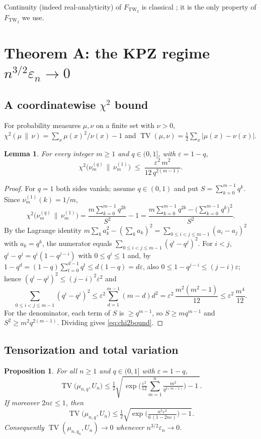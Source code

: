 \documentclass[12pt]{article}
\newtheorem{proposition}{Proposition}
\newtheorem{lemma}{Lemma}
\theoremstyle{definition}
\DeclareMathOperator{\TV}{TV}
\newcommand{\TW}{\mathrm{TW}_2}
\newcommand{\eps}{\varepsilon}
\begin{document}
Continuity (indeed real-analyticity) of $F_{\TW}$ is classical \cite{TW}; it is the only
property of $F_{\TW}$ we use.

\section{Theorem A: the KPZ regime $n^{3/2}\eps_n\to0$}\label{sec:A}

\subsection{A coordinatewise $\chi^2$ bound}
For probability measures $\mu,\nu$ on a finite set with $\nu>0$,
$\chi^2(\mu\,\|\,\nu)=\sum_x \mu(x)^2/\nu(x)-1$ and
$\TV(\mu,\nu)=\tfrac12\sum_x|\mu(x)-\nu(x)|$.

\begin{lemma}\label{lem:chi2}
For every integer $m\ge1$ and $q\in(0,1]$, with $\eps=1-q$,
\begin{equation}\label{eq:chi2bound}
\chi^2\!\big(\nu^{(q)}_m\,\big\|\,\nu^{(1)}_m\big)\;\le\;\frac{\eps^2\,m^2}{12\,q^{2(m-1)}}.
\end{equation}
\end{lemma}

\begin{proof}
For $q=1$ both sides vanish; assume $q\in(0,1)$ and put $S=\sum_{k=0}^{m-1}q^{k}$. Since
$\nu^{(1)}_m(k)=1/m$,
\[
\chi^2\!\big(\nu^{(q)}_m\,\big\|\,\nu^{(1)}_m\big)
=\frac{m\sum_{k=0}^{m-1}q^{2k}}{S^2}-1
=\frac{m\sum_{k=0}^{m-1}q^{2k}-\big(\sum_{k=0}^{m-1}q^{k}\big)^2}{S^2}.
\]
By the Lagrange identity $m\sum_k a_k^2-(\sum_k a_k)^2=\sum_{0\le i<j\le m-1}(a_i-a_j)^2$
with $a_k=q^k$, the numerator equals $\sum_{0\le i<j\le m-1}(q^{i}-q^{j})^2$. For $i<j$,
$q^{i}-q^{j}=q^{i}(1-q^{j-i})$ with $0\le q^{i}\le1$ and, by
$1-q^{d}=(1-q)\sum_{t=0}^{d-1}q^{t}\le d(1-q)=d\eps$, also $0\le 1-q^{j-i}\le(j-i)\eps$;
hence $(q^i-q^j)^2\le (j-i)^2\eps^2$ and
\[
\sum_{0\le i<j\le m-1}(q^{i}-q^{j})^2\le \eps^2\sum_{d=1}^{m-1}(m-d)d^2
=\eps^2\,\frac{m^2(m^2-1)}{12}\le \eps^2\,\frac{m^4}{12}.
\]
For the denominator, each term of $S$ is $\ge q^{m-1}$, so $S\ge mq^{m-1}$ and
$S^2\ge m^2q^{2(m-1)}$. Dividing gives \eqref{eq:chi2bound}.
\end{proof}

\subsection{Tensorization and total variation}
\begin{proposition}\label{prop:TVupper}
For all $n\ge1$ and $q\in(0,1]$ with $\eps=1-q$,
\begin{equation}\label{eq:TVupper}
\TV\big(\mu_{n,q},U_n\big)\le
\tfrac12\sqrt{\,\exp\!\Big(\tfrac{\eps^2}{12}\sum_{m=1}^{n}\tfrac{m^2}{q^{2(m-1)}}\Big)-1\,}.
\end{equation}
If moreover $2n\eps\le1$, then
\begin{equation}\label{eq:TVclean}
\TV\big(\mu_{n,q},U_n\big)\le \tfrac12\sqrt{\exp\!\Big(\tfrac{n^3\eps^2}{6\,(1-2n\eps)}\Big)-1}.
\end{equation}
Consequently $\TV(\mu_{n,q_n},U_n)\to0$ whenever $n^{3/2}\eps_n\to0$.
\end{proposition}
\end{document}
